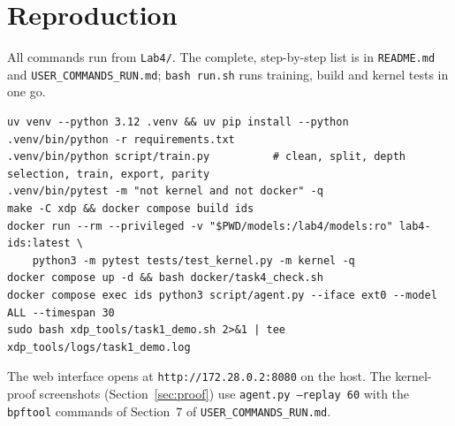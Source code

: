 \chapter{Reproduction}\label{app:repro}

All commands run from \texttt{Lab4/}. The complete, step-by-step list is in \texttt{README.md} and \texttt{USER\_COMMANDS\_RUN.md}; \texttt{bash run.sh} runs training, build and kernel tests in one go.

\begin{lstlisting}[style=bashsh]
uv venv --python 3.12 .venv && uv pip install --python .venv/bin/python -r requirements.txt
.venv/bin/python script/train.py          # clean, split, depth selection, train, export, parity
.venv/bin/pytest -m "not kernel and not docker" -q
make -C xdp && docker compose build ids
docker run --rm --privileged -v "$PWD/models:/lab4/models:ro" lab4-ids:latest \
    python3 -m pytest tests/test_kernel.py -m kernel -q
docker compose up -d && bash docker/task4_check.sh
docker compose exec ids python3 script/agent.py --iface ext0 --model ALL --timespan 30
sudo bash xdp_tools/task1_demo.sh 2>&1 | tee xdp_tools/logs/task1_demo.log
\end{lstlisting}

The web interface opens at \texttt{http://172.28.0.2:8080} on the host. The kernel-proof screenshots (Section~\ref{sec:proof}) use \texttt{agent.py --replay 60} with the \texttt{bpftool} commands of Section~7 of \texttt{USER\_COMMANDS\_RUN.md}.
